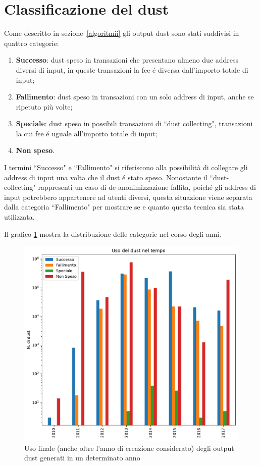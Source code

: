\section{Classificazione del dust}
Come descritto in sezione~\ref{algoritmii} gli output dust sono stati suddivisi in quattro categorie:
\begin{enumerate}
    \item \textbf{Successo}: dust speso in transazioni che presentano almeno due address diversi di input, in queste transazioni la fee é diversa dall'importo totale di input;
    \item \textbf{Fallimento}: dust speso in transazioni con un solo address di input, anche se ripetuto più volte;
    \item \textbf{Speciale}: dust speso in possibili transazioni di ``dust collecting", transazioni la cui fee é uguale all'importo totale di input;
    \item \textbf{Non speso}.
\end{enumerate}

I termini ``Successo" e ``Fallimento" si riferiscono alla possibilità di collegare gli address di input una volta che il dust é stato speso. Nonostante il ``dust-collecting" rappresenti un caso di de-anonimizzazione fallita, poiché gli address di input potrebbero appartenere ad utenti diversi, questa situazione viene separata dalla categoria ``Fallimento" per mostrare se e quanto questa tecnica sia stata utilizzata.

Il grafico \ref{fig:dust_year} mostra la distribuzione delle categorie nel corso degli anni.
\begin{figure}[h!]
    \centering
    \includegraphics[scale=0.6]{Grafici/uso_del_dust_new.pdf}
    \caption{Uso finale (anche oltre l'anno di creazione considerato) degli output dust generati in un determinato anno}
    \label{fig:dust_year}
\end{figure}
\FloatBarrier

